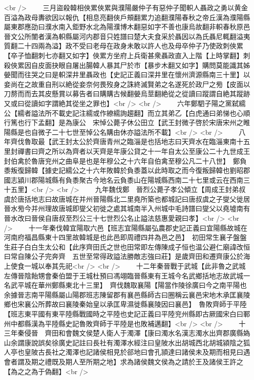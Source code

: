 <br />
　　三月盜殺韓相俠累俠累與濮陽嚴仲子有惡仲子聞軹人聶政之勇以黄金百溢為政母夀欲因以報仇【相息亮翻俠戶頰翻累力追翻濮陽春秋之帝丘漢為濮陽縣屬東郡應劭曰濮水南入鉅野水北為陽濮博木翻惡如字不善也康烏故翻非軹春秋原邑晉文公所闈者漢為軹縣屬河内郡音只姓譜曰楚大夫食采於聶因以為氏聶尼輒翻溢夷質翻二十四兩為溢】政不受曰老母在政身未敢以許人也及母卒仲子乃使政刺俠累【卒子恤翻刺七亦翻又如字】俠累方坐府上兵衛甚衆聶政直入上階【上時掌翻】刺殺俠累因自皮面抉眼自屠出腸韓人暴其尸於市【暴步木翻又如字】購問莫能識其姊嫈聞而往哭之曰是軹深井里聶政也【史記正義曰深井里在懷州濟源縣南三十里】以妾尚在之故重自刑以絶從妾奈何畏歿身之誅終滅賢弟之名遂死於政尸之㫄【皮面以刀剺而而去其皮懸賞以募告者曰購購古候翻嫈烏莖翻絶從之從讀曰蹤謂自絶其蹤跡又或曰從讀如字謂絶其從坐之罪也】<br />
<br />
　　六年鄭駟子陽之黨弑繻公【繻者謚法所不載史記注繻或作繚繻詢趨翻】而立其弟乙【白虎通曰弟悌也心順行篤也行下孟翻】是為康公　宋悼公薨子休公田立【武王封微子啓於宋唐宋州之睢陽縣是也自微子二十七世至悼公名購由休亦謚法所不載】<br />
<br />
　　八年齊伐魯取最【武王封太公於齊唐青州之臨淄是也括地志曰天齊水在臨淄東南十五里封禪書曰齊之所以為齊者以天齊是年康公貸之十一年自太公至康公二十九世成王封伯禽於魯唐兖州之曲阜是也是年穆公之十六年自伯禽至穆公凡二十八世】　鄭負黍叛復歸韓【據史記繻公之十六年敗韓於負黍蓋以此時取之而今復叛歸韓也劉昭郡國志潁川郡陽城縣有負黍聚古今地名云負黍山在陽城縣西南二十七里或云在西南三十五里】<br />
<br />
　　九年魏伐鄭　晉烈公薨子孝公傾立【周成王封弟叔虞於唐括地志曰故唐城在并州晉陽縣北二里堯所築也都城記曰唐叔虞之子燮父徙居晉水㫄今并州理故唐城即燮父初徙之處其城南半入州城中毛詩譜曰燮父以堯墟南有晉水改曰晉侯自唐叔至烈公三十七世烈公名止謚法慈惠愛親曰孝】<br />
<br />
　　十一年秦伐韓宜陽取六邑【班志宜陽縣屬弘農郡史記正義曰宜陽縣故城在河南府福昌縣東十四里故韓城是也此邑即周禮四井為邑之邑】　初田常生襄子盤盤生莊子白白生太公和【此序齊田氏之世也田常即左傳陳成子恒也温公避仁廟諱改恒曰常自陳公子完奔齊　五世至常得政謚法勝敵志強曰莊】是歲齊田和遷齊康公於海上使食一城以奉其先祀<br />
<br />
　　十二年秦晉戰于武城【此非魯之武城左傳晉陰飴甥會秦伯盟于王城杜預曰馮翊臨晉縣東有王城今名武鄉括地志故武城一名武平城在華州鄭縣東北十三里】　齊伐魏取襄陽【陽當作陵徐廣曰今之南平陽也余據晉志南平陽縣屬山陽郡班志陳留郡有襄邑縣師古曰圈稱云襄邑宋地木承匡襄陵鄉也宋襄公所葬故曰襄陵秦始皇以承匡卑濕徙縣襄陵因曰襄邑】　魯敗齊師于平陸【班志東平國有東平陸縣戰國時之平陸也史記正義曰平陸兖州縣即古厥國宋白曰鄆州中都縣漢為平陸縣史記魯敗齊師于平陸是也敗補邁翻】<br />
<br />
　　十三年秦侵晉　齊田和會魏文侯楚人衛人于濁澤【康曰濁水名漢志濁水出齊郡廣縣媯山余謂康說誤矣徐廣史記註曰長社有濁澤水經注曰皇陂水出胡城西北胡城潁陰之狐人亭也皇陂古長社之濁澤也記諸侯相見於郤地曰會孔頴達曰諸侯未及期而相見曰遇會者謂及期之禮既及期人至所期之地】求為諸侯魏文侯為之請於王及諸侯王許之【為之之為于偽翻】<br />
